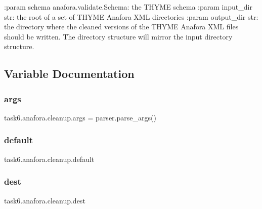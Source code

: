 \begin{DoxyVerb}:param schema anafora.validate.Schema: the THYME schema
:param input_dir str: the root of a set of THYME Anafora XML directories
:param output_dir str: the directory where the cleaned versions of the THYME Anafora XML files should be written.
    The directory structure will mirror the input directory structure.
\end{DoxyVerb}
 

\subsection{Variable Documentation}
\mbox{\label{namespacetask6_1_1anafora_1_1cleanup_a21aef80e0635aec95af03db18cc80952}} 
\subsubsection{\texorpdfstring{args}{args}}
{\footnotesize\ttfamily task6.\+anafora.\+cleanup.\+args = parser.\+parse\+\_\+args()}

\mbox{\label{namespacetask6_1_1anafora_1_1cleanup_a8f82d28e68c8e010a9f7da2a1a727d9d}} 
\subsubsection{\texorpdfstring{default}{default}}
{\footnotesize\ttfamily task6.\+anafora.\+cleanup.\+default}

\mbox{\label{namespacetask6_1_1anafora_1_1cleanup_adfab330e8a60c554f7e360b56e3543fa}} 
\subsubsection{\texorpdfstring{dest}{dest}}
{\footnotesize\ttfamily task6.\+anafora.\+cleanup.\+dest}

